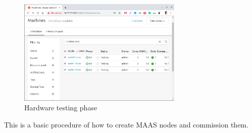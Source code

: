 \begin{figure}[!ht]
    \centering
    \includegraphics[width=0.7\textwidth]{images/5-7.png}
    \caption{Hardware testing phase}
\end{figure}

This is a basic procedure of how to create MAAS nodes and commission them.